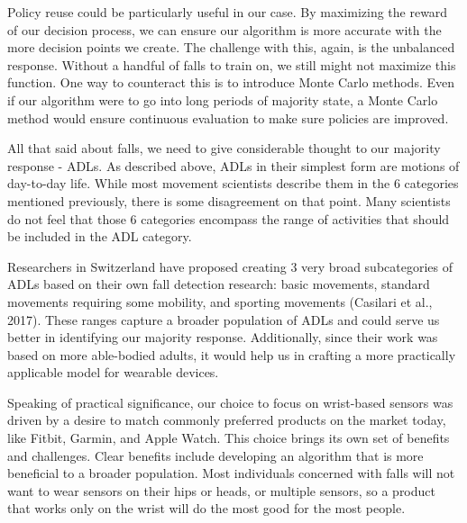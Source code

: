 \documentclass{llncs}
\begin{document}
	Policy reuse could be particularly useful in our case. By maximizing the reward of our decision process, we can ensure our algorithm is more accurate with the more decision points we create. The challenge with this, again, is the unbalanced response. Without a handful of falls to train on, we still might not maximize this function. One way to counteract this is to introduce Monte Carlo methods. Even if our algorithm were to go into long periods of majority state, a Monte Carlo method would ensure continuous evaluation to make sure policies are improved.
	
	All that said about falls, we need to give considerable thought to our majority response - ADLs. As described above, ADLs in their simplest form are motions of day-to-day life. While most movement scientists describe them in the 6 categories mentioned previously, there is some disagreement on that point. Many scientists do not feel that those 6 categories encompass the range of activities that should be included in the ADL category.
	
	Researchers in Switzerland have proposed creating 3 very broad subcategories of ADLs based on their own fall detection research: basic movements, standard movements requiring some mobility, and sporting movements (Casilari et al., 2017).\cite{casilari2017analysis} These ranges capture a broader population of ADLs and could serve us better in identifying our majority response. Additionally, since their work was based on more able-bodied adults, it would help us in crafting a more practically applicable model for wearable devices.
	
	Speaking of practical significance, our choice to focus on wrist-based sensors was driven by a desire to match commonly preferred products on the market today, like Fitbit, Garmin, and Apple Watch. This choice brings its own set of benefits and challenges. Clear benefits include developing an algorithm that is more beneficial to a broader population. Most individuals concerned with falls will not want to wear sensors on their hips or heads, or multiple sensors, so a product that works only on the wrist will do the most good for the most people. 
	
\end{document}
